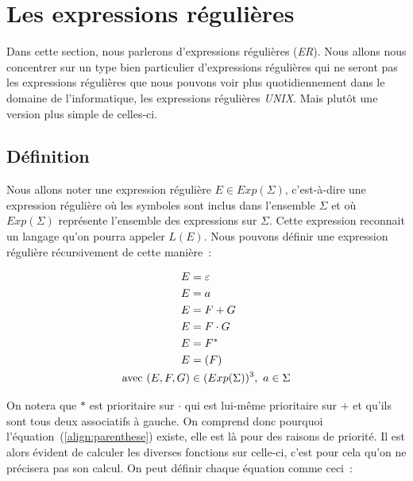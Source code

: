 \section{Les expressions régulières}

Dans cette section, nous parlerons d'expressions régulières (\textit{ER}). Nous
allons nous concentrer sur un type bien particulier d'expressions régulières
qui ne seront pas les expressions régulières que nous pouvons voir plus
quotidiennement dans le domaine de l'informatique, les expressions régulières
\textit{UNIX}. Mais plut\^{o}t une version plus simple de celles-ci.

\subsection{Définition}

Nous allons noter une expression régulière \(E \in Exp(\Sigma)\), c'est-à-dire
une expression régulière où les symboles sont inclus dans l'ensemble \(\Sigma\)
et où \(Exp(\Sigma)\) représente l'ensemble des expressions sur \(\Sigma\).
Cette expression reconnait un langage qu'on pourra appeler \(L(E)\). Nous
pouvons définir une expression régulière récursivement de cette manière~:

\begin{align}
    E                      & = \varepsilon                            \\
    E                      & = a                                      \\
    E                      & = F + G                                  \\
    E                      & = F \cdot G                              \\
    E                      & = F^*                                    \\
    E                      & = (F)\label{align:parenthese}            \\
    \text{avec } (E, F, G) & \in (Exp(\Sigma))^3,~ a \in \Sigma\notag
\end{align}

On notera que \(*\) est prioritaire sur \(\cdot\) qui est lui-même prioritaire
sur \(+\) et qu'ils sont tous deux associatifs à gauche. On comprend donc
pourquoi l'équation~(\ref{align:parenthese}) existe, elle est là pour des
raisons de priorité. Il est alors évident de calculer les diverses fonctions
sur celle-ci, c'est pour cela qu'on ne précisera pas son
calcul\label{subsec:parenthese}. On peut définir chaque équation comme ceci~:

